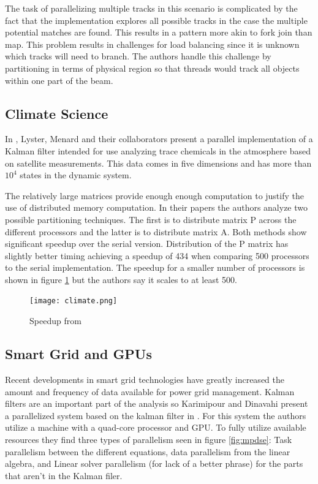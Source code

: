 \documentclass[11pt]{article}
\begin{document}
The task of parallelizing multiple tracks in this scenario is complicated by the fact that the implementation explores all possible tracks in the case the multiple potential matches are found. This results in a pattern more akin to fork join than map. This problem results in challenges for load balancing since it is unknown which tracks will need to branch. The authors handle this challenge by partitioning in terms of physical region so that threads would track all objects within one part of the beam.


\subsection{Climate Science}
In \cite{menard2000assimilation1,menard2000assimilation2,lyster1997parallel}, Lyster, Menard and their collaborators present a parallel implementation of a Kalman filter intended for use analyzing trace chemicals in the atmosphere based on satellite measurements. This data comes in five dimensions and has more than $10^4$ states in the dynamic system. 

The relatively large matrices provide enough enough computation to justify the use of distributed memory computation. In their papers the authors analyze two possible partitioning techniques. The first is to distribute matrix P across the different processors and the latter is to distribute matrix A. Both methods show significant speedup over the serial version. Distribution of the P matrix has slightly better timing achieving a speedup of 434 when comparing 500 processors to the serial implementation. The speedup for a smaller number of processors is shown in figure \ref{fig:climate} but the authors say it scales to at least 500.

\begin{figure}
\centering
\texttt{[image: climate.png]}
\caption{Speedup from \cite{lyster1997parallel}}
\label{fig:climate}
\end{figure}



\subsection{Smart Grid and GPUs}
Recent developments in smart grid technologies have greatly increased the amount and frequency of data available for power grid management. Kalman filters are an important part of the analysis so Karimipour and Dinavahi present a parallelized system based on the kalman filter in \cite{karimipour2015extended}. For this system the authors utilize a machine with a quad-core processor and GPU. To fully utilize available resources they find three types of parallelism seen in figure \ref{fig:mpdse}: Task parallelism between the different equations, data parallelism from the linear algebra, and Linear solver parallelism (for lack of a better phrase) for the parts that aren't in the Kalman filer.
\end{document}
